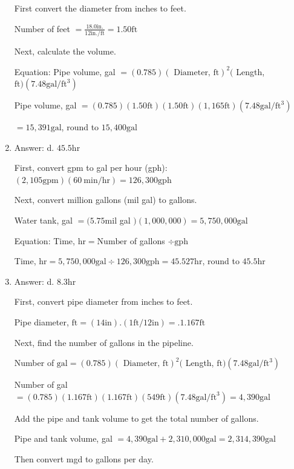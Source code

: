 \documentclass[10pt]{article}
\begin{document}
\begin{enumerate}
First convert the diameter from inches to feet.

Number of feet $=\frac{18.0 \mathrm{in} .}{12 \mathrm{in} . / \mathrm{ft}}=1.50 \mathrm{ft}$

Next, calculate the volume.

Equation: Pipe volume, gal $=(0.785)(\text { Diameter, } \mathrm{ft})^{2}($ Length, $\mathrm{ft})\left(7.48 \mathrm{gal} / \mathrm{ft}^{3}\right)$

Pipe volume, gal $=(0.785)(1.50 \mathrm{ft})(1.50 \mathrm{ft})(1,165 \mathrm{ft})\left(7.48 \mathrm{gal} / \mathrm{ft}^{3}\right)$

$=15,391 \mathrm{gal}$, round to $15,400 \mathrm{gal}$

  \item Answer: d. $45.5 \mathrm{hr}$

First, convert gpm to gal per hour (gph): $(2,105 \mathrm{gpm})(60 \mathrm{~min} / \mathrm{hr})=126,300 \mathrm{gph}$

Next, convert million gallons (mil gal) to gallons.

Water tank, gal $=(5.75 \mathrm{mil}$ gal $)(1,000,000)=5,750,000 \mathrm{gal}$

Equation: Time, $\mathrm{hr}=\mathrm{Number}$ of gallons $\div \mathrm{gph}$

Time, $\mathrm{hr}=5,750,000 \mathrm{gal} \div 126,300 \mathrm{gph}=45.527 \mathrm{hr}$, round to $45.5 \mathrm{hr}$ 

  \item Answer: d. $8.3 \mathrm{hr}$

First, convert pipe diameter from inches to feet.

Pipe diameter, $\mathrm{ft}=(14 \mathrm{in}).(1 \mathrm{ft} / 12 \mathrm{in})=.1.167 \mathrm{ft}$

Next, find the number of gallons in the pipeline.

Number of $\mathrm{gal}=(0.785)(\text { Diameter, } \mathrm{ft})^{2}($ Length, $\mathrm{ft})\left(7.48 \mathrm{gal} / \mathrm{ft}^{3}\right)$

Number of gal $=(0.785)(1.167 \mathrm{ft})(1.167 \mathrm{ft})(549 \mathrm{ft})\left(7.48 \mathrm{gal} / \mathrm{ft}^{3}\right)=4,390 \mathrm{gal}$

Add the pipe and tank volume to get the total number of gallons.

Pipe and tank volume, gal $=4,390 \mathrm{gal}+2,310,000 \mathrm{gal}=2,314,390 \mathrm{gal}$

Then convert mgd to gallons per day.


\end{enumerate}
\end{document}
